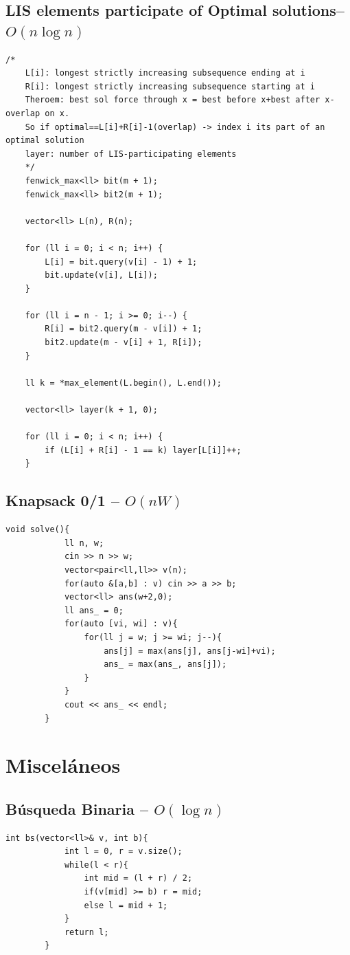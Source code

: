 \documentclass[10pt,a4paper,twocolumn]{article}
\begin{document}
	\subsection{LIS elements participate of Optimal solutions-- $O(n \log n)$}
	\begin{lstlisting}[style=cpp, title={LIS$\_$elements$\_$optimal.cpp}]
    /*
    L[i]: longest strictly increasing subsequence ending at i
    R[i]: longest strictly increasing subsequence starting at i
    Theroem: best sol force through x = best before x+best after x-overlap on x.
    So if optimal==L[i]+R[i]-1(overlap) -> index i its part of an optimal solution
    layer: number of LIS-participating elements
    */
    fenwick_max<ll> bit(m + 1);
    fenwick_max<ll> bit2(m + 1);

    vector<ll> L(n), R(n);

    for (ll i = 0; i < n; i++) {
        L[i] = bit.query(v[i] - 1) + 1;
        bit.update(v[i], L[i]);
    }

    for (ll i = n - 1; i >= 0; i--) {
        R[i] = bit2.query(m - v[i]) + 1;
        bit2.update(m - v[i] + 1, R[i]);
    }

    ll k = *max_element(L.begin(), L.end());

    vector<ll> layer(k + 1, 0);

    for (ll i = 0; i < n; i++) {
        if (L[i] + R[i] - 1 == k) layer[L[i]]++;
    }
    \end{lstlisting}

    \subsection{Knapsack 0/1 -- $O(nW)$}
	
	\begin{lstlisting}[style=cpp, title={mochila.cpp}]
		void solve(){
			ll n, w;
			cin >> n >> w;
			vector<pair<ll,ll>> v(n);
			for(auto &[a,b] : v) cin >> a >> b;
			vector<ll> ans(w+2,0);
			ll ans_ = 0;
			for(auto [vi, wi] : v){
				for(ll j = w; j >= wi; j--){
					ans[j] = max(ans[j], ans[j-wi]+vi);
					ans_ = max(ans_, ans[j]);
				}
			}
			cout << ans_ << endl;
		}
	\end{lstlisting}

	\section{Miscel\'aneos}
	
	\subsection{B\'usqueda Binaria -- $O(\log n)$}
	
	\begin{lstlisting}[style=cpp, title={binary search.cpp}]
		int bs(vector<ll>& v, int b){
			int l = 0, r = v.size();
			while(l < r){
				int mid = (l + r) / 2;
				if(v[mid] >= b) r = mid;
				else l = mid + 1;
			}
			return l;
		}
	\end{lstlisting}
	
\end{document}

